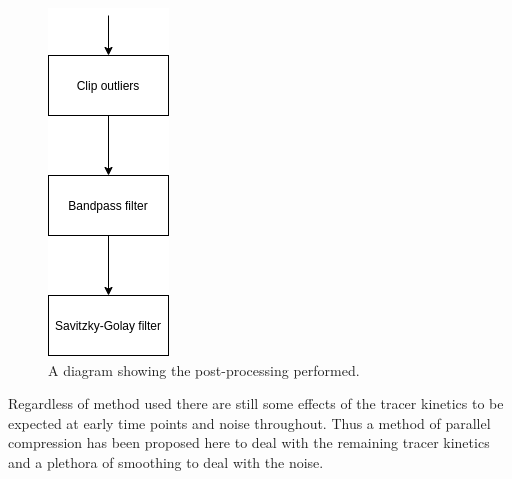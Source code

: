                     \begin{figure}
                        \centering
                        
                        \includegraphics[width=0.5\linewidth]{figures/data_driven_surrogate_signal_extraction_methods_1_post_processing.png}
                        
                        \captionsetup{singlelinecheck=false, justification=centering}
                        \caption{A diagram showing the post-processing performed.}
                        \label{fig:pca_data_driven_surrogate_signal_extraction_methods_for_dynamic_pet_methods_post_processing}
                    \end{figure}
                    
                    Regardless of method used there are still some effects of the tracer kinetics to be expected at early time points and noise throughout. Thus a method of parallel compression has been proposed here to deal with the remaining tracer kinetics and a plethora of smoothing to deal with the noise.
                    
